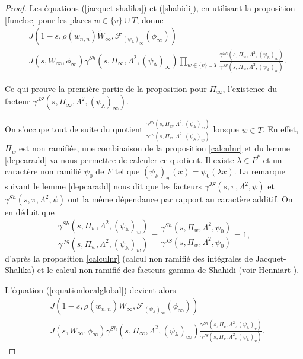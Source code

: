 \documentclass{amsart}
\begin{document}
\begin{proof}
 Les équations (\ref{jacquet-shalika}) et (\ref{shahidi}), en utilisant la proposition \ref{funcloc} pour les places $w \in \{v\} \cup T$, donne
 \begin{equation}
 \label{equationlocalglobal}
 \begin{split}
 & J(1-s, \rho(w_{n,n})\tilde{W}_\infty, \mathcal{F}_{(\psi_\mathbb{A})_\infty}(\phi_\infty)) = \\
 & J(s, W_\infty, \phi_\infty)\gamma^{Sh}(s, \Pi_\infty, \Lambda^2, (\psi_\mathbb{A})_\infty) \prod_{w \in \{v\} \cup T} \frac{\gamma^{Sh}(s, \Pi_w, \Lambda^2, (\psi_\mathbb{A})_w)}{\gamma^{JS}(s, \Pi_w, \Lambda^2, (\psi_\mathbb{A})_w)}.
 \end{split}
 \end{equation}
 
 Ce qui prouve la première partie de la proposition pour $\Pi_\infty$, l'existence du facteur $\gamma^{JS}(s, \Pi_\infty, \Lambda^2, (\psi_\mathbb{A})_\infty)$.
 
 On s'occupe tout de suite du quotient $\frac{\gamma^{Sh}(s, \Pi_w, \Lambda^2, (\psi_\mathbb{A})_w)}{\gamma^{JS}(s, \Pi_w, \Lambda^2, (\psi_\mathbb{A})_w)}$ lorsque $w \in T$. En effet, $\Pi_w$ est non ramifiée, une combinaison de la proposition \ref{calculnr} et du lemme \ref{depcaradd} va nous permettre de calculer ce quotient. Il existe $\lambda \in F^*$ et un caractère non ramifié $\psi_0$ de $F$ tel que $(\psi_\mathbb{A})_w(x) = \psi_0(\lambda x)$. La remarque suivant le lemme \ref{depcaradd} nous dit que les facteurs $\gamma^{JS}(s, \pi, \Lambda^2, \psi)$ et $\gamma^{Sh}(s, \pi, \Lambda^2, \psi)$ ont la même dépendance par rapport au caractère additif. On en déduit que
 \begin{equation}
 \frac{\gamma^{Sh}(s, \Pi_w, \Lambda^2, (\psi_\mathbb{A})_w)}{\gamma^{JS}(s, \Pi_w, \Lambda^2, (\psi_\mathbb{A})_w)} = \frac{\gamma^{Sh}(s, \Pi_w, \Lambda^2, \psi_0)}{\gamma^{JS}(s, \Pi_w, \Lambda^2, \psi_0)} = 1,
 \end{equation}
 d'après la proposition \ref{calculnr} (calcul non ramifié des intégrales de Jacquet-Shalika) et le calcul non ramifié des facteurs gamma de Shahidi (voir Henniart \cite{henniart}).
 
 L'équation (\ref{equationlocalglobal}) devient alors
 \begin{equation}
 \begin{split}
 & J(1-s, \rho(w_{n,n})\tilde{W}_\infty, \mathcal{F}_{(\psi_\mathbb{A})_\infty}(\phi_\infty)) = \\
 & J(s, W_\infty, \phi_\infty)\gamma^{Sh}(s, \Pi_\infty, \Lambda^2, (\psi_\mathbb{A})_\infty) \frac{\gamma^{Sh}(s, \Pi_v, \Lambda^2, (\psi_\mathbb{A})_v)}{\gamma^{JS}(s, \Pi_v, \Lambda^2, (\psi_\mathbb{A})_v)}.
 \end{split}
 \end{equation}
 

\end{proof}
\end{document}
